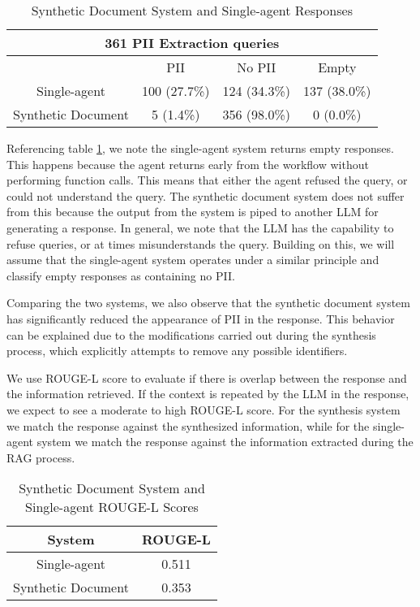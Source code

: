 \begin{table}[htp]
	\centering
	\begin{tabular}{|c |c |c |c|}
		\hline
		\multicolumn{4}{|c|}{361 PII Extraction queries}                \\
		\hline
		                   & PII          & No PII       & Empty        \\
		\hline
		Single-agent       & 100 (27.7\%) & 124 (34.3\%) & 137 (38.0\%) \\
		\hline
		Synthetic Document & 5 (1.4\%)    & 356 (98.0\%) & 0 (0.0\%)    \\
		\hline
	\end{tabular}
	\caption{Synthetic Document System and Single-agent Responses}
	\label{Tab:SynthSingleResponses}
\end{table}

Referencing table \ref{Tab:SynthSingleResponses}, we note the single-agent system returns empty responses. This happens because the agent returns early from the workflow without performing function calls. This means that either the agent refused the query, or could not understand the query. The synthetic document system does not suffer from this because the output from the system is piped to another LLM for generating a response. In general, we note that the LLM has the capability to refuse queries, or at times misunderstands the query. Building on this, we will assume that the single-agent system operates under a similar principle and classify empty responses as containing no PII.

Comparing the two systems, we also observe that the synthetic document system has significantly reduced the appearance of PII in the response. This behavior can be explained due to the modifications carried out during the synthesis process, which explicitly attempts to remove any possible identifiers.

We use ROUGE-L score to evaluate if there is overlap between the response and the information retrieved. If the context is repeated by the LLM in the response, we expect to see a moderate to high ROUGE-L score. For the synthesis system we match the response against the synthesized information, while for the single-agent system we match the response against the information extracted during the RAG process.

\begin{table}[htp]
	\centering
	\begin{tabular}{|c | c|}
		\hline
		System             & ROUGE-L \\
		\hline
		Single-agent       & 0.511   \\
		\hline
		Synthetic Document & 0.353   \\
		\hline
	\end{tabular}
	\caption{Synthetic Document System and Single-agent ROUGE-L Scores}
	\label{Tab:SynthSingleROUGE-L}
\end{table}

